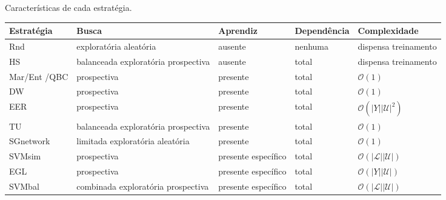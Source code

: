 \begin{quadro}
\caption[Características de cada estratégia.]{Características de cada estratégia.}
\label{stratsparcial}
\centering
\begin{threeparttable}
\begin{tabular}{|l|p{3cm}|p{2cm}|l|p{3.2cm}|}
\hline
\textbf{Estratégia}		& \textbf{Busca}		&\textbf{Aprendiz}  & \textbf{Dependência}		&\textbf{Complexidade}  \\ \hline
Rnd\tnote{a}			& {exploratória\phantom{oo} aleatória} 		& ausente			& nenhuma							&dispensa treinamento  \\ \hline
HS\tnote{b}			&{balanceada exploratória prospectiva}	& ausente		& total							&dispensa treinamento\tnote{*}  \\ \hline
Mar/Ent\tnote{a} /QBC\tnote{c}	& prospectiva					& presente		& total							&$\mathcal{O}(1)$  \\ \hline
DW\tnote{d}			& prospectiva					& presente		& total							&$\mathcal{O}(1)$  \\ \hline
EER\tnote{e}			& prospectiva					& presente	& total							&$\mathcal{O}(|Y||\mathcal{U}|^2)$  \\ \hline
TU\tnote{f}			&{balanceada exploratória prospectiva}	& presente		& total							&$\mathcal{O}(1)$  \\ \hline
SGnetwork\tnote{g}		&{limitada exploratória aleatória}	& presente			& total							&$\mathcal{O}(1)$  \\ \hline
SVMsim\tnote{h}			& prospectiva					&{presente \phantom{oooo} específico}	& total							&$\mathcal{O}(|\mathcal{L}||\mathcal{U}|)$  \\ \hline
EGL\tnote{i}			& prospectiva					&{presente \phantom{oooo} específico}	& total							&$\mathcal{O}(|Y||\mathcal{U}|)$  \\ \hline
SVMbal\tnote{j}			&{combinada exploratória prospectiva}&{presente \phantom{oooo} específico}			& total							&$\mathcal{O}(|\mathcal{L}||\mathcal{U}|)$  \\ \hline
\end{tabular}

\end{threeparttable}
\end{quadro}
